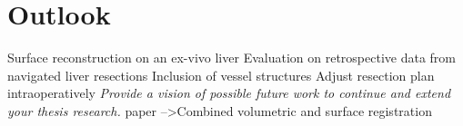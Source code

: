 %
%
%
\chapter{Outlook}

Surface reconstruction on an ex-vivo liver
Evaluation on retrospective data from navigated liver resections
Inclusion of vessel structures
Adjust resection plan intraoperatively
\textit{Provide a vision of possible future work to continue and extend your thesis research.}
\cite{postelnicu2009combined} paper -->Combined volumetric and surface registration

\endinput
